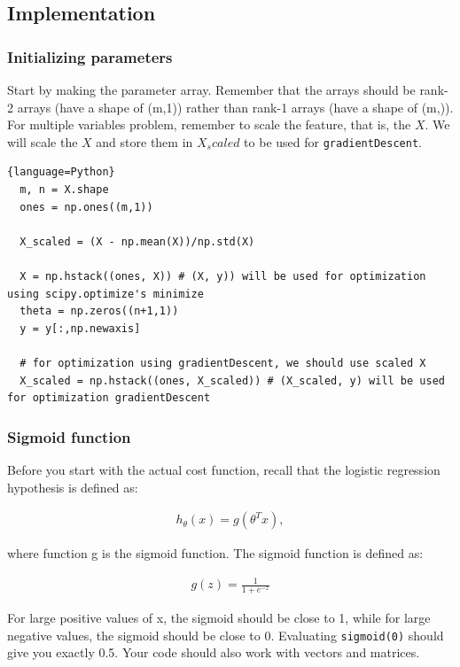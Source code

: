 \documentclass[12pt]{article}
\begin{document}
\subsection{Implementation}

\subsubsection{Initializing parameters}

Start by making the parameter array. Remember that the arrays should be rank-2 arrays (have a shape of (m,1)) rather than rank-1 arrays (have a shape of (m,)). For multiple variables problem, remember to scale the feature, that is, the $X$. We will scale the $X$ and store them in $X_scaled$ to be used for \texttt{gradientDescent}.

\begin{lstlisting}{language=Python}
  m, n = X.shape
  ones = np.ones((m,1))
  
  X_scaled = (X - np.mean(X))/np.std(X)
  
  X = np.hstack((ones, X)) # (X, y)) will be used for optimization using scipy.optimize's minimize
  theta = np.zeros((n+1,1))
  y = y[:,np.newaxis]
  
  # for optimization using gradientDescent, we should use scaled X
  X_scaled = np.hstack((ones, X_scaled)) # (X_scaled, y) will be used for optimization gradientDescent
\end{lstlisting}


\subsubsection{Sigmoid function}
Before you start with the actual cost function, recall that the logistic regression hypothesis is defined as:

\begin{align} \label{eq:hx}
  h_\theta(x) = g(\theta^Tx),
\end{align}

where function g is the sigmoid function. The sigmoid function is defined as:

\begin{align} \label{eq:gz}
  g(z) = \frac{1}{1+e^{-z}}
\end{align}

For large positive values of x, the sigmoid should be close to 1, while for large negative values, the sigmoid should be close to 0. Evaluating \texttt{sigmoid(0)} should give you exactly 0.5. Your code should also work with vectors and matrices.
\end{document}
